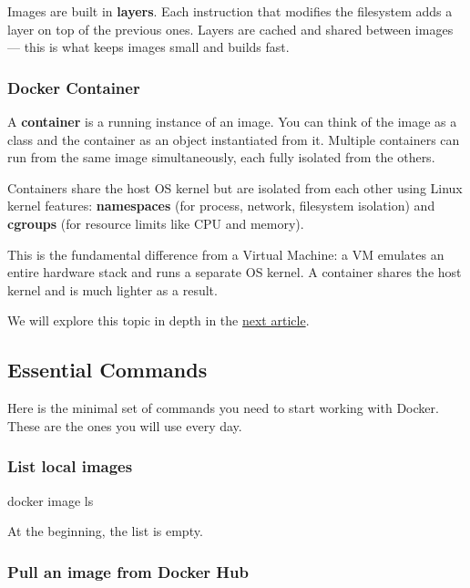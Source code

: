 \documentclass[11pt,american,a4paper,openany]{book}
\newenvironment{Shaded}{}{}
\newcommand{\NormalTok}[1]{#1}
\begin{document}
Images are built in \textbf{layers}. Each instruction that modifies the
filesystem adds a layer on top of the previous ones. Layers are cached
and shared between images --- this is what keeps images small and builds
fast.

\subsubsection{Docker Container}\label{docker-container}

A \textbf{container} is a running instance of an image. You can think of
the image as a class and the container as an object instantiated from
it. Multiple containers can run from the same image simultaneously, each
fully isolated from the others.

Containers share the host OS kernel but are isolated from each other
using Linux kernel features: \textbf{namespaces} (for process, network,
filesystem isolation) and \textbf{cgroups} (for resource limits like CPU
and memory).

This is the fundamental difference from a Virtual Machine: a VM emulates
an entire hardware stack and runs a separate OS kernel. A container
shares the host kernel and is much lighter as a result.

We will explore this topic in depth in the
\href{/Users/sasadangelo/github.com/sasadangelo/code4projects/containers-vs-virtual-machines-2025/}{next
article}.

\subsection{Essential Commands}\label{essential-commands}

Here is the minimal set of commands you need to start working with
Docker. These are the ones you will use every day.

\subsubsection{List local images}\label{list-local-images}

\begin{Shaded}
\begin{Highlighting}[]
\NormalTok{docker image ls}
\end{Highlighting}
\end{Shaded}

At the beginning, the list is empty.

\subsubsection{Pull an image from Docker
Hub}\label{pull-an-image-from-docker-hub}
\end{document}
